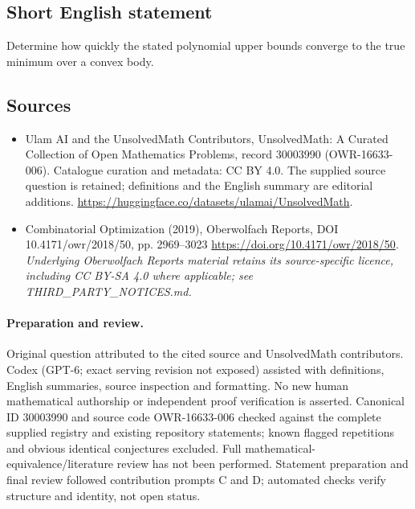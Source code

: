\documentclass[11pt]{article}
\begin{document}
\subsection{Short English statement}
Determine how quickly the stated polynomial upper bounds converge to the true minimum over a convex body.
\subsection{Sources}
\begin{itemize}
\item[\hypertarget{source:30003990:1}{S1}] Ulam AI and the UnsolvedMath Contributors, UnsolvedMath: A Curated Collection of Open Mathematics Problems, record 30003990 (OWR-16633-006). Catalogue curation and metadata: CC BY 4.0. The supplied source question is retained; definitions and the English summary are editorial additions.
\url{https://huggingface.co/datasets/ulamai/UnsolvedMath}.
\item[\hypertarget{source:30003990:2}{S2}] Combinatorial Optimization (2019), Oberwolfach Reports, DOI 10.4171/owr/2018/50, pp. 2969--3023
\url{https://doi.org/10.4171/owr/2018/50}.
\textit{Underlying Oberwolfach Reports material retains its source-specific licence, including CC BY-SA 4.0 where applicable; see THIRD\_PARTY\_NOTICES.md.}
\end{itemize}
\paragraph{Preparation and review.}
Original question attributed to the cited source and UnsolvedMath contributors. Codex (GPT-6; exact serving revision not exposed) assisted with definitions, English summaries, source inspection and formatting. No new human mathematical authorship or independent proof verification is asserted. Canonical ID 30003990 and source code OWR-16633-006 checked against the complete supplied registry and existing repository statements; known flagged repetitions and obvious identical conjectures excluded. Full mathematical-equivalence/literature review has not been performed. Statement preparation and final review followed contribution prompts C and D; automated checks verify structure and identity, not open status.
\label{end:30003990}
\end{document}
